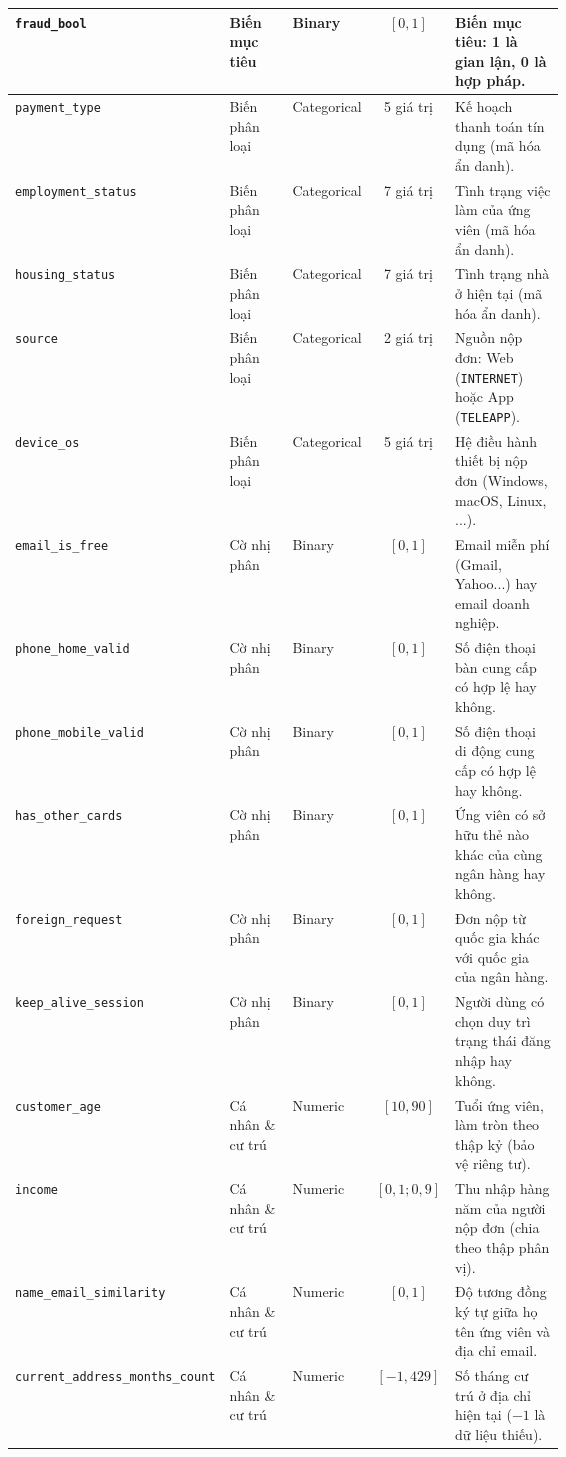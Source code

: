 \begin{footnotesize}
\begin{longtable}{>{\raggedright\arraybackslash}p{0.23\linewidth} >{\raggedright\arraybackslash}p{0.15\linewidth} l c >{\raggedright\arraybackslash}p{0.26\linewidth}}
\texttt{fraud\_bool} & Biến mục tiêu & Binary & $[0, 1]$ & \textbf{Biến mục tiêu}: 1 là gian lận, 0 là hợp pháp. \\
\midrule
\texttt{payment\_type} & Biến phân loại & Categorical & 5 giá trị & Kế hoạch thanh toán tín dụng (mã hóa ẩn danh). \\
\texttt{employment\_status} & Biến phân loại & Categorical & 7 giá trị & Tình trạng việc làm của ứng viên (mã hóa ẩn danh). \\
\texttt{housing\_status} & Biến phân loại & Categorical & 7 giá trị & Tình trạng nhà ở hiện tại (mã hóa ẩn danh). \\
\texttt{source} & Biến phân loại & Categorical & 2 giá trị & Nguồn nộp đơn: Web (\texttt{INTERNET}) hoặc App (\texttt{TELEAPP}). \\
\texttt{device\_os} & Biến phân loại & Categorical & 5 giá trị & Hệ điều hành thiết bị nộp đơn (Windows, macOS, Linux, ...). \\
\midrule
\texttt{email\_is\_free} & Cờ nhị phân & Binary & $[0, 1]$ & Email miễn phí (Gmail, Yahoo...) hay email doanh nghiệp. \\
\texttt{phone\_home\_valid} & Cờ nhị phân & Binary & $[0, 1]$ & Số điện thoại bàn cung cấp có hợp lệ hay không. \\
\texttt{phone\_mobile\_valid} & Cờ nhị phân & Binary & $[0, 1]$ & Số điện thoại di động cung cấp có hợp lệ hay không. \\
\texttt{has\_other\_cards} & Cờ nhị phân & Binary & $[0, 1]$ & Ứng viên có sở hữu thẻ nào khác của cùng ngân hàng hay không. \\
\texttt{foreign\_request} & Cờ nhị phân & Binary & $[0, 1]$ & Đơn nộp từ quốc gia khác với quốc gia của ngân hàng. \\
\texttt{keep\_alive\_session} & Cờ nhị phân & Binary & $[0, 1]$ & Người dùng có chọn duy trì trạng thái đăng nhập hay không. \\
\midrule
\texttt{customer\_age} & Cá nhân \& cư trú & Numeric & $[10, 90]$ & Tuổi ứng viên, làm tròn theo thập kỷ (bảo vệ riêng tư). \\
\texttt{income} & Cá nhân \& cư trú & Numeric & $[0,1; 0,9]$ & Thu nhập hàng năm của người nộp đơn (chia theo thập phân vị). \\
\texttt{name\_email\_}\allowbreak\texttt{similarity} & Cá nhân \& cư trú & Numeric & $[0, 1]$ & Độ tương đồng ký tự giữa họ tên ứng viên và địa chỉ email. \\
\texttt{current\_address\_}\allowbreak\texttt{months\_count} & Cá nhân \& cư trú & Numeric & $[-1, 429]$ & Số tháng cư trú ở địa chỉ hiện tại ($-1$ là dữ liệu thiếu). \\

\end{longtable}
\end{footnotesize}
